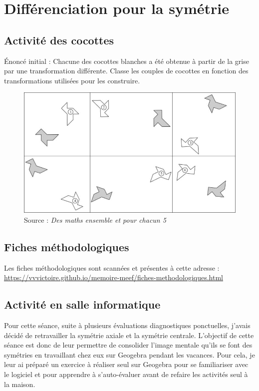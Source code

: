 \section{Différenciation pour la symétrie}

\subsection{Activité des cocottes}\label{annexe:symetrie-act}

Énoncé initial : Chacune des cocottes blanches a été obtenue à partir de la grise par une transformation différente.  Classe les couples de cocottes en fonction des transformations utilisées pour les construire. 

\begin{figure}[h!]
    \centering
    \includegraphics[width=0.9\linewidth]{img/activitemepcc.jpg}
    \caption{Source : \textit{Des maths ensemble et pour chacun 5}}
    \label{fig:symetrie-act}
\end{figure}

\subsection{Fiches méthodologiques}\label{annexe:symetrie-fiches}

Les fiches méthodologiques sont scannées et présentes à cette adresse : \url{https://vvvictoire.github.io/memoire-meef/fiches-methodologiques.html}

\subsection{Activité en salle informatique}\label{annexe:symetrie-tice}

Pour cette séance, suite à plusieurs évaluations diagnostiques ponctuelles, j'avais décidé de retravailler la symétrie axiale et la symétrie centrale. L'objectif de cette séance est donc de leur permettre de consolider l'image mentale qu'ils se font des symétries en travaillant chez eux sur Geogebra pendant les vacances. Pour cela, je leur ai préparé un exercice à réaliser seul sur Geogebra pour se familiariser avec le logiciel et pour apprendre à s'auto-évaluer avant de refaire les activités seul à la maison.

